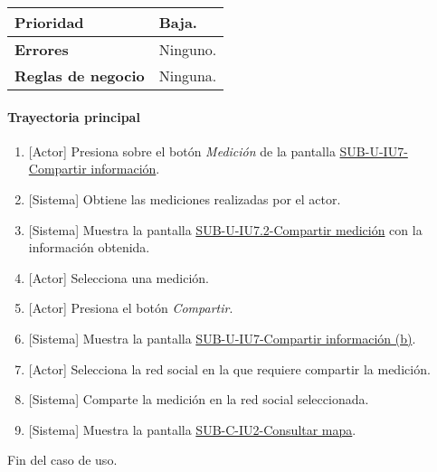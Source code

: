 \begin{longtable}{|J{5cm}|J{10.3cm}|}
		\\ \hline 
	\textbf{Prioridad} & 
		Baja. \\ \hline
	\textbf{Errores} & Ninguno.
		\\ \hline
	\textbf{Reglas de negocio} & Ninguna.
		 \\ \hline
\end{longtable}

\paragraph{Trayectoria principal}
	\begin{enumerate}
		\item {[Actor]} Presiona sobre el botón \textit{Medición} de la pantalla \hyperref[fig:sub-u-iu7]{SUB-U-IU7-Compartir información}.
		\item {[Sistema]} Obtiene las mediciones realizadas por el actor.
		\item {[Sistema]} Muestra la pantalla \hyperref[fig:sub-u-iu7.2]{SUB-U-IU7.2-Compartir medición} con la información obtenida.
		\item {[Actor]} Selecciona una medición.
		\item {[Actor]} Presiona el botón \textit{Compartir}.
		\item \label{SUB-U-CU7.2:Pantalla} {[Sistema]} Muestra la pantalla \hyperref[fig:sub-u-iu7.b]{SUB-U-IU7-Compartir información (b)}.
		\item {[Actor]} Selecciona la red social en la que requiere compartir la medición.
		\item {[Sistema]} Comparte la medición en la red social seleccionada.
		\item \label{SUB-U-CU1:Pantalla} {[Sistema]} Muestra la pantalla \hyperref[fig:sub-c-iu2]{SUB-C-IU2-Consultar mapa}.
	\end{enumerate}
	Fin del caso de uso.


